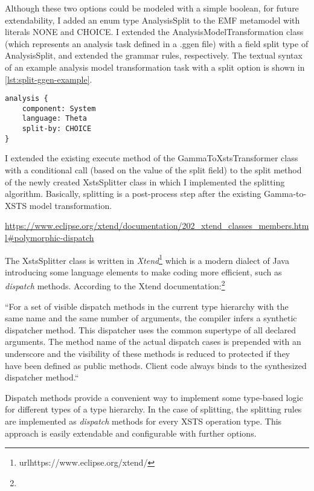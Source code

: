 Although these two options could be modeled with a simple boolean, for future extendability, I added an enum type \textsf{AnalysisSplit} to the EMF metamodel with literals \textsf{NONE} and \textsf{CHOICE}. I extended the \textsf{AnalysisModelTransformation} class (which represents an analysis task defined in a .ggen file) with a field \textsf{split} type of \textsf{AnalysisSplit}, and extended the grammar rules, respectively. The textual syntax of an example analysis model transformation task with a split option is shown in \autoref{lst:split-ggen-example}.

\begin{lstlisting}[float={htbp},language=ggen,caption={Example analysis model transformation task with a split option in a .ggen file.},label={lst:split-ggen-example},linewidth=\textwidth]
analysis {
    component: System
    language: Theta
    split-by: CHOICE
}
\end{lstlisting}

I extended the existing \textsf{execute} method of the \textsf{GammaToXstsTransformer} class with a conditional call (based on the value of the \textsf{split} field) to the \textsf{split} method of the newly created \textsf{XstsSplitter} class in which I implemented the splitting algorithm. Basically, splitting is a post-process step after the existing Gamma-to-XSTS model transformation.

\urldef\xtenddispatchdurl\url{https://www.eclipse.org/xtend/documentation/202_xtend_classes_members.html#polymorphic-dispatch}

The \textsf{XstsSplitter} class is written in \textit{Xtend}\footnote{url{https://www.eclipse.org/xtend/}} which is a modern dialect of Java introducing some language elements to make coding more efficient, such as \textit{dispatch} methods. According to the Xtend documentation:\footnote{\xtenddispatchdurl}

``For a set of visible dispatch methods in the current type hierarchy with the same name and the same number of arguments, the compiler infers a synthetic dispatcher method. This dispatcher uses the common supertype of all declared arguments. The method name of the actual dispatch cases is prepended with an underscore and the visibility of these methods is reduced to protected if they have been defined as public methods. Client code always binds to the synthesized dispatcher method.``

Dispatch methods provide a convenient way to implement some type-based logic for different types of a type hierarchy. In the case of splitting, the splitting rules are implemented as \textit{dispatch} methods for every XSTS operation type. This approach is easily extendable and configurable with further options.

